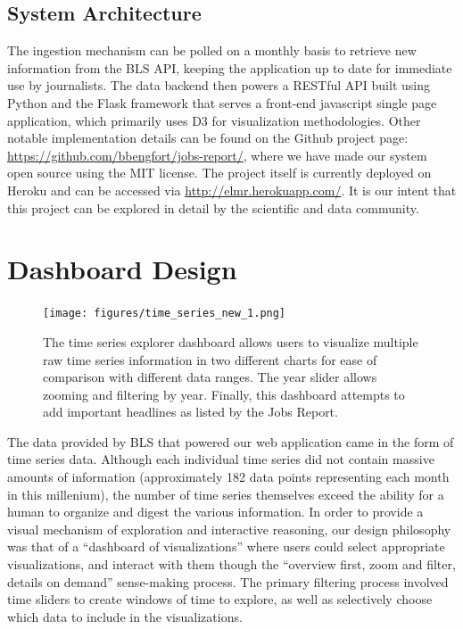 \documentclass[11pt,letterpaper]{article}
\begin{document}
\subsection{System Architecture}

The ingestion mechanism can be polled on a monthly basis to retrieve new information from the BLS API, keeping the application up to date for immediate use by journalists. The data backend then powers a RESTful API built using Python and the Flask framework that serves a front-end javascript single page application, which primarily uses D3 for visualization methodologies. Other notable implementation details can be found on the Github project page: \url{https://github.com/bbengfort/jobs-report/}, where we have made our system open source using the MIT license. The project itself is currently deployed on Heroku and can be accessed via \url{http://elmr.herokuapp.com/}. It is our intent that this project can be explored in detail by the scientific and data community.

\section{Dashboard Design}

\begin{figure}[!ht]
    \centering
    \texttt{[image: figures/time\_series\_new\_1.png]}
    \caption{The time series explorer dashboard allows users to visualize multiple raw time series information in two different charts for ease of comparison with different data ranges. The year slider allows zooming and filtering by year. Finally, this dashboard attempts to add important headlines as listed by the Jobs Report.}
    \label{fig:time_series}
\end{figure}

The data provided by BLS that powered our web application came in the form of time series data. Although each individual time series did not contain massive amounts of information (approximately 182 data points representing each month in this millenium), the number of time series themselves exceed the ability for a human to organize and digest the various information. In order to provide a visual mechanism of exploration and interactive reasoning, our design philosophy was that of a ``dashboard of visualizations'' where users could select appropriate visualizations, and interact with them though the ``overview first, zoom and filter, details on demand'' sense-making process. The primary filtering process involved time sliders to create windows of time to explore, as well as selectively choose which data to include in the visualizations.
\end{document}
